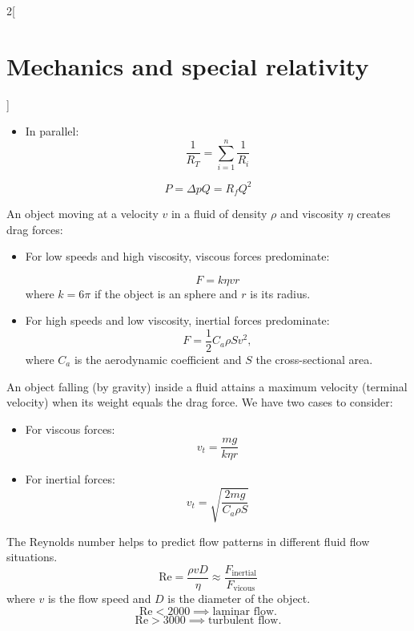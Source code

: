 \documentclass[../../../main.tex]{subfiles}
\begin{document}
\begin{multicols}{2}[\section{Mechanics and special relativity}]
\begin{concept}
\begin{itemize}
    \item In parallel: $$\frac{1}{R_T}=\sum_{i=1}^n\frac{1}{R_i}$$
\end{itemize}
\end{concept}
\begin{concept}
$$P=\Delta pQ=R_fQ^2$$
\end{concept}
\begin{concept}
An object moving at a velocity $v$ in a fluid of density $\rho$ and viscosity $\eta$ creates drag forces:
\begin{itemize}
    \item For low speeds and high viscosity, viscous forces predominate:\par 
    $$F=k\eta vr$$
    where $k=6\pi$ if the object is an sphere and $r$ is its radius.
    \item For high speeds and low viscosity, inertial forces predominate:
    $$F=\frac{1}{2}C_a\rho Sv^2,$$
    where $C_a$ is the aerodynamic coefficient and $S$ the cross-sectional area.
\end{itemize}
\end{concept}
\begin{concept}
An object falling (by gravity) inside a fluid attains a maximum velocity (terminal velocity) when its weight equals the drag force. We have two cases to consider:
\begin{itemize}
    \item For viscous forces: $$v_t=\frac{mg}{k\eta r}$$
    \item For inertial forces: $$v_t=\sqrt{\frac{2mg}{C_a\rho S}}$$
\end{itemize}
\end{concept}
\begin{concept}
The Reynolds number helps to predict flow patterns in different fluid flow situations.
$$\text{Re}=\frac{\rho vD}{\eta}\approx\frac{F_{\text{inertial}}}{F_{\text{vicous}}}$$
where $v$ is the flow speed and $D$ is the diameter of the object. 
$$\text{Re}<2000\implies\text{laminar flow}.$$
$$\text{Re}>3000\implies\text{turbulent flow}.$$
\end{concept}


\end{multicols}
\end{document}
